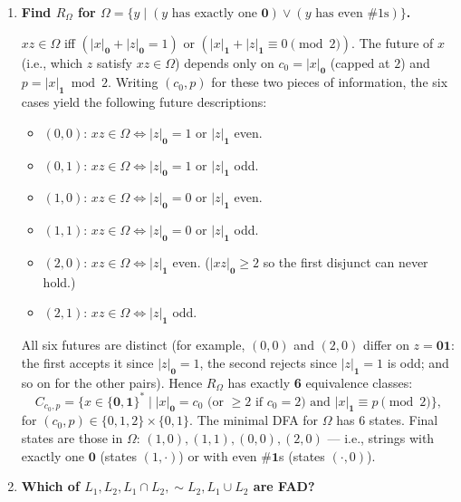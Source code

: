\begin{enumerate}[{2.}1.]
\begin{enumerate}
\item Other languages: any of the $2^5-2=30$ nonempty proper unions of the 5 classes.
\end{enumerate}

\item \textbf{Find $R_\Omega$ for $\Omega=\{y\mid(y\text{ has exactly one }\mathbf{0})\vee(y\text{ has even \#1s})\}$.}

$xz\in\Omega$ iff $(|x|_\mathbf{0}+|z|_\mathbf{0}=1)$ or $(|x|_\mathbf{1}+|z|_\mathbf{1}\equiv 0\pmod 2)$.
The future of $x$ (i.e., which $z$ satisfy $xz\in\Omega$) depends only on $c_0=|x|_\mathbf{0}$ (capped at $2$) and $p=|x|_\mathbf{1}\bmod 2$.
Writing $(c_0,p)$ for these two pieces of information, the six cases yield the following future descriptions:

\begin{itemize}
\item $(0,0)$: $xz\in\Omega\Leftrightarrow |z|_\mathbf{0}=1$ or $|z|_\mathbf{1}$ even.
\item $(0,1)$: $xz\in\Omega\Leftrightarrow |z|_\mathbf{0}=1$ or $|z|_\mathbf{1}$ odd.
\item $(1,0)$: $xz\in\Omega\Leftrightarrow |z|_\mathbf{0}=0$ or $|z|_\mathbf{1}$ even.
\item $(1,1)$: $xz\in\Omega\Leftrightarrow |z|_\mathbf{0}=0$ or $|z|_\mathbf{1}$ odd.
\item $(2,0)$: $xz\in\Omega\Leftrightarrow |z|_\mathbf{1}$ even. \quad ($|xz|_\mathbf{0}\geq 2$ so the first disjunct can never hold.)
\item $(2,1)$: $xz\in\Omega\Leftrightarrow |z|_\mathbf{1}$ odd.
\end{itemize}

All six futures are distinct (for example, $(0,0)$ and $(2,0)$ differ on $z=\mathbf{01}$: the first accepts it since $|z|_\mathbf{0}=1$, the second rejects since $|z|_\mathbf{1}=1$ is odd; and so on for the other pairs). Hence $R_\Omega$ has exactly \textbf{6} equivalence classes:
\[
C_{c_0,p}=\{x\in\{\mathbf{0},\mathbf{1}\}^*\mid |x|_\mathbf{0}=c_0\text{ (or }\geq 2\text{ if }c_0=2)\text{ and }|x|_\mathbf{1}\equiv p\pmod 2\},
\]
for $(c_0,p)\in\{0,1,2\}\times\{0,1\}$.
The minimal DFA for $\Omega$ has 6 states. Final states are those in $\Omega$: $(1,0),(1,1),(0,0),(2,0)$ — i.e., strings with exactly one $\mathbf{0}$ (states $(1,\cdot)$) or with even \#$\mathbf{1}$s (states $(\cdot,0)$).

\item \textbf{Which of $L_1,L_2,L_1\cap L_2,\sim L_2,L_1\cup L_2$ are FAD?}


\end{enumerate}
